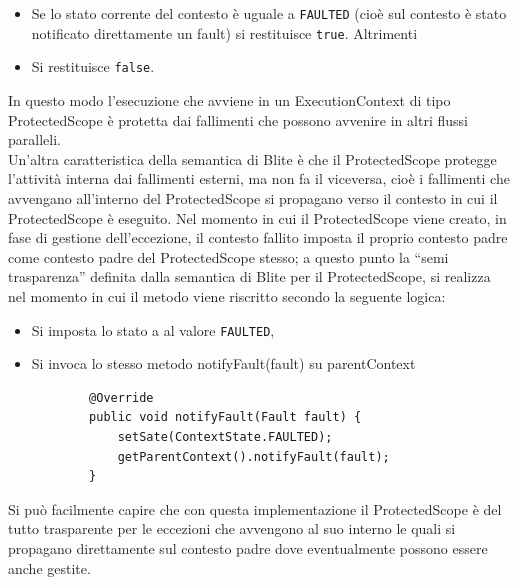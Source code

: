 \begin{itemize}
  \item Se lo stato corrente del contesto \`e uguale a \texttt{FAULTED} (cioè
  sul contesto \`e stato notificato direttamente un fault) si restituisce
  \texttt{true}. Altrimenti 
  \item Si restituisce \texttt{false}.
\end{itemize}

In questo modo l'esecuzione che avviene in un ExecutionContext di tipo
ProtectedScope \`e protetta dai fallimenti che possono avvenire in altri flussi
paralleli. 
\\

Un'altra caratteristica della semantica di Blite \`e che il ProtectedScope
protegge l'attività interna dai fallimenti esterni, ma non fa il viceversa, cioè i
fallimenti che avvengano all'interno del ProtectedScope si propagano verso il
contesto in cui il ProtectedScope \`e eseguito. Nel momento in cui il
ProtectedScope viene creato, in fase di gestione dell'eccezione, il contesto
fallito imposta il proprio contesto padre come contesto padre del ProtectedScope
stesso; a questo punto la ``semi trasparenza'' definita dalla semantica di Blite
per il ProtectedScope, si realizza nel momento in cui il metodo
 viene riscritto secondo la seguente logica:

\begin{itemize}
  \item Si imposta lo stato a al valore \texttt{FAULTED},
  \item Si invoca lo stesso metodo notifyFault(fault) su parentContext
	\begin{lstlisting}
		@Override
   		public void notifyFault(Fault fault) {
        	setSate(ContextState.FAULTED);
        	getParentContext().notifyFault(fault);
    	}
  	\end{lstlisting}   
\end{itemize}

Si può facilmente capire che con questa implementazione il ProtectedScope è del
tutto trasparente per le eccezioni che avvengono al suo interno le quali si
propagano direttamente sul contesto padre dove eventualmente possono essere
anche gestite.
